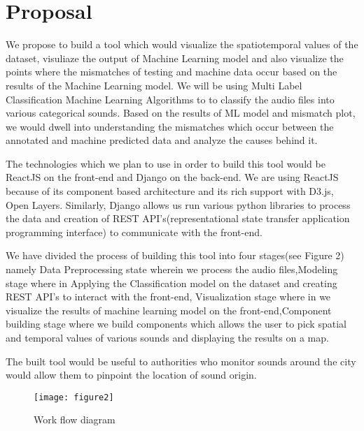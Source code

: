 	\section{Proposal}
    We propose to build a tool which would visualize the spatiotemporal values of the dataset, visuliaze the output of Machine Learning model and also visualize the points where the mismatches of testing and machine data occur based on the results of the Machine Learning model. We will be using Multi Label Classification Machine Learning Algorithms to to classify the audio files into various categorical sounds. Based on the results of ML model and mismatch plot, we would dwell into understanding the mismatches which occur between the annotated and machine predicted data and analyze the causes behind it. 
    
    The technologies which we plan to use in order to build this tool would be ReactJS on the front-end and Django on the back-end. We are using ReactJS because of its component based architecture and its  rich support with D3.js, Open Layers. Similarly, Django allows us run various python libraries to process the data and creation of REST API's(representational state transfer application programming interface) to communicate with the front-end. 
   
   	We have divided the process of building this tool into four stages(see Figure 2) namely Data Preprocessing state wherein we process the audio files,Modeling stage where in Applying the Classification model on the dataset and creating REST API's to interact with the front-end, Visualization stage where in we visualize the results of machine learning model on the front-end,Component building stage where we build components which allows the user to pick spatial and temporal values of various sounds and displaying the results on a map.
   	
    The built tool would be useful to authorities who monitor sounds around the city would allow them to pinpoint the location of sound origin.
	\begin{figure}[h!]
	\texttt{[image: figure2]}
	\caption{ Work flow diagram}
	\end{figure}
	
	
